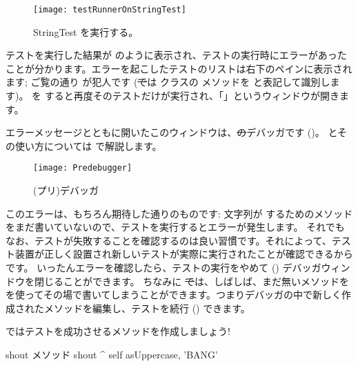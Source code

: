 \documentclass[a4paper,10pt,twoside]{book}
\begin{document}
\begin{figure}[hbt]
\centerline {\texttt{[image: testRunnerOnStringTest]}}
\caption{StringTest を実行する。
}
\end{figure}

テストを実行した結果が  のように表示され、テストの実行時にエラーがあったことが分かります。エラーを起こしたテストのリストは右下のペインに表示されます; ご覧の通り  が犯人です
(\st では  クラスの  メソッドを  と表記して識別します)。
 を \click すると再度そのテストだけが実行され、「」というウィンドウが開きます。

エラーメッセージとともに開いたこのウィンドウは、\st のデバッガです ()。
とその使い方については  で解説します。

\begin{figure}[hbt]
\centerline {\texttt{[image: Predebugger]}}
\caption{(プリ)デバッガ}
\end{figure}

このエラーは、もちろん期待した通りのものです: 文字列が  するためのメソッドをまだ書いていないので、テストを実行するとエラーが発生します。
それでもなお、テストが失敗することを確認するのは良い習慣です。それによって、テスト装置が正しく設置され新しいテストが実際に実行されたことが確認できるからです。
いったんエラーを確認したら、テストの実行をやめて () デバッガウィンドウを閉じることができます。
ちなみに \st では、しばしば、まだ無いメソッドを  を使ってその場で書いてしまうことができます。つまりデバッガの中で新しく作成されたメソッドを編集し、テストを続行 () できます。

ではテストを成功させるメソッドを作成しましょう!

\begin{method}[shout]{shout メソッド}
shout
	^ self asUppercase, 'BANG'
\end{method}
\end{document}
